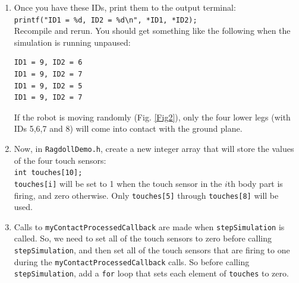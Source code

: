 \documentclass[12pt]{article}
\begin{document}
\begin{enumerate}
\item Once you have these IDs, print them to the output terminal:\\
  \verb|printf("ID1 = %d, ID2 = %d\n", *ID1, *ID2);|\\ Recompile and rerun. You should get something like the following when the simulation is running unpaused:
    \begin{verbatim}
ID1 = 9, ID2 = 6
ID1 = 9, ID2 = 7
ID1 = 9, ID2 = 5
ID1 = 9, ID2 = 7
\end{verbatim}
    If the robot is moving randomly (Fig. \ref{Fig2}), only the four lower legs (with IDs 5,6,7 and 8) will come into contact with the ground plane.

\item Now, in \verb|RagdollDemo.h|, create a new integer array that will store the values of the four touch sensors:\\
    \texttt{int touches[10];} \\
    \texttt{touches[i]} will be set to 1 when the touch sensor in the $i$th body part is firing, and zero otherwise. Only \texttt{touches[5]} through \texttt{touches[8]} will be used.


\item Calls to \verb|myContactProcessedCallback| are made when \verb|stepSimulation| is called.  So, we need to set all of the touch sensors to zero before calling \texttt{stepSimulation}, and then set all of the touch sensors that are firing to one during the \texttt{myContactProcessedCallback} calls. So before calling \texttt{stepSimulation}, add a \texttt{for} loop that sets each element of \texttt{touches} to zero.


\end{enumerate}
\end{document}
